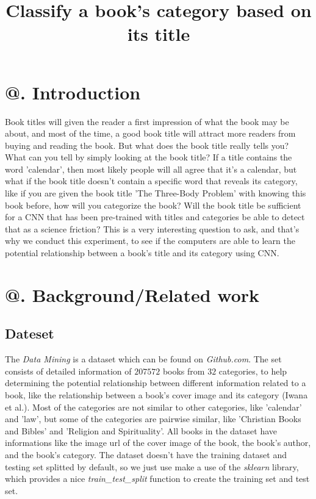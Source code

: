 \documentclass[jou,apacite, 10px]{apa6}
\title{Classify a book's category based on its title}
\makeatletter
\newcommand*{\rom}[1]{\expandafter\@slowromancap\romannumeral #1@}
\makeatother
\begin{document}
\maketitle    
                        
\section{\rom{1}. Introduction}
Book titles will given the reader a first impression of what the book may be about, and most of the time, a good book title will attract more readers from buying and reading the book. But what does the book title really tells you? What can you tell by simply looking at the book title? If a title contains the word 'calendar', then most likely people will all agree that it's a calendar, but what if the book title doesn't contain a specific word that reveals its category, like if you are given the book title 'The Three-Body Problem' with knowing this book before, how will you categorize the book? Will the book title be sufficient for a CNN that has been pre-trained with titles and categories be able to detect that as a science friction? This is a very interesting question to ask, and that's why we conduct this experiment, to see if the computers are able to learn the potential relationship between a book's title and its category using CNN.

\section{\rom{2}. Background/Related work}

\subsection{Dateset}
The \textit{Data Mining} is a dataset which can be found on \textit{Github.com}. The set consists of detailed information of $207572$  books from $32$ categories, to help determining the potential relationship between different information related to a book, like the relationship between a book's cover image and its category (Iwana et al.). Most of the categories are not similar to other categories, like 'calendar' and 'law', but some of the categories are pairwise similar, like 'Christian Books and Bibles' and 'Religion and Spirituality'. All books in the dataset have informations like the image url of the cover image of the book, the book's author, and the book's category. The dataset doesn't have the training dataset and testing set splitted by default, so we just use make a use of the \textit{sklearn} library, which provides a nice \textit{train\_test\_split} function to create the training set and test set.
\end{document}
